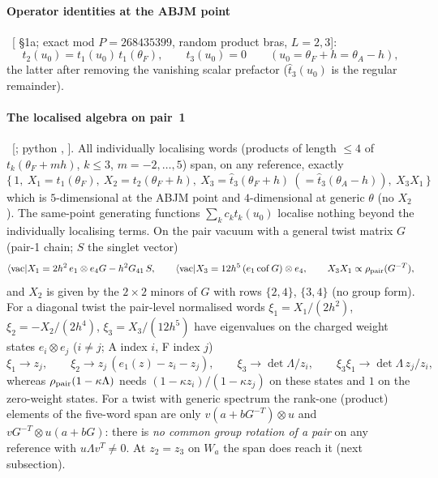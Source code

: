 \paragraph{Operator identities at the ABJM point} \ex\ [ \S1a; exact mod $P=268435399$, random product bras, $L=2,3$]:
\begin{equation}
 t_2(u_0)=t_1(u_0)\,t_1(\theta_F),\qquad t_3(u_0)=0\qquad(u_0=\theta_F+h=\theta_A-h),
\end{equation}
the latter after removing the vanishing scalar prefactor ($\hat t_3(u_0)$ is the regular remainder).

\paragraph{The localised algebra on pair~1} \ex\ [; python , ]. All individually localising words (products of length $\le4$ of $t_k(\theta_F+mh)$, $k\le3$, $m=-2,\dots,5$) span, on any reference, exactly
\begin{equation}\label{eq:kappa-alg}
 \{\,1,\ X_1=t_1(\theta_F),\ X_2=t_2(\theta_F+h),\ X_3=\hat t_3(\theta_F+h)\ (=\hat t_3(\theta_A-h)),\ X_3X_1\,\}
\end{equation}
which is $5$-dimensional at the ABJM point and $4$-dimensional at generic $\theta$ (no $X_2$). The same-point generating functions $\sum_kc_kt_k(u_0)$ localise nothing beyond the individually localising terms.
On the pair vacuum with a general twist matrix $G$ (pair-1 chain; $S$ the singlet vector)
\begin{equation}
 \langle\mathrm{vac}|X_1=2h^2\,e_1\otimes e_4G-h^2G_{41}\,S,\qquad \langle\mathrm{vac}|X_3=12h^5\,(e_1\,\mathrm{cof}\,G)\otimes e_4,\qquad X_3X_1\propto\rho_{\rm pair}(G^{-T}),
\end{equation}
and $X_2$ is given by the $2\times2$ minors of $G$ with rows $\{2,4\}$, $\{3,4\}$ (no group form). For a diagonal twist the pair-level normalised words
$\xi_1=X_1/(2h^2)$, $\xi_2=-X_2/(2h^4)$, $\xi_3=X_3/(12h^5)$ have eigenvalues on the charged weight states $e_i\otimes e_j$ ($i\ne j$; A index $i$, F index $j$)
\begin{equation}\label{eq:kappa-xi}
 \xi_1\to z_j,\qquad \xi_2\to z_j\,(e_1(z)-z_i-z_j),\qquad \xi_3\to\det\Lambda/z_i,\qquad \xi_3\xi_1\to\det\Lambda\,z_j/z_i ,
\end{equation}
whereas $\rho_{\rm pair}(1-\kappa\Lambda)$ needs $(1-\kappa z_i)/(1-\kappa z_j)$ on these states and $1$ on the zero-weight states. For a twist with generic spectrum the rank-one (product) elements of the five-word span are only
$v(a+bG^{-T})\otimes u$ and $vG^{-T}\otimes u(a+bG)$: there is \emph{no common group rotation of a pair} on any reference with $u\Lambda v^T\neq0$. At $z_2=z_3$ on $W_a$ the span does reach it (next subsection).

